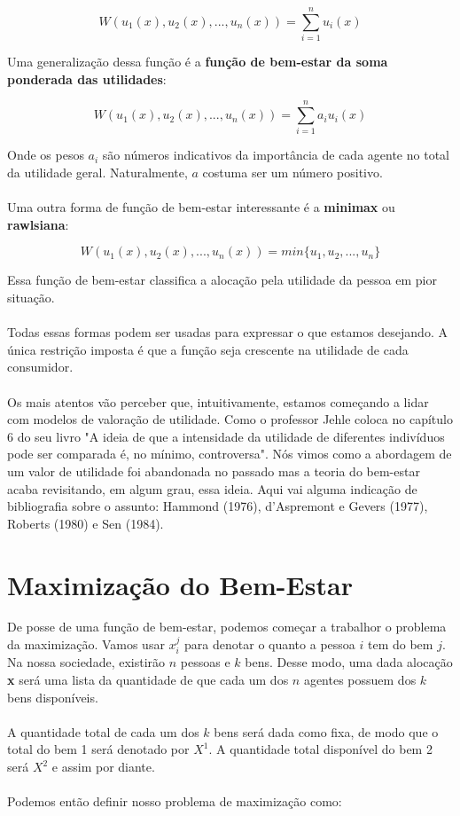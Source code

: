 \documentclass[a4paper,11pt,oneside]{book}
\theoremstyle{definition}
\theoremstyle{break}
\begin{document}
$$ W(u_1(x),u_2(x),...,u_n(x)) = \displaystyle \sum^n_{i = 1} u_i(x)$$

Uma generalização dessa função é a \textbf{função de bem-estar da soma ponderada das utilidades}:

$$ W(u_1(x),u_2(x),...,u_n(x)) = \displaystyle \sum^n_{i = 1} a_iu_i(x)$$

Onde os pesos $a_i$ são números indicativos da importância de cada agente no total da utilidade geral. Naturalmente, $a$ costuma ser um número positivo.
\\~\\
Uma outra forma de função de bem-estar interessante é a \textbf{minimax} ou \textbf{rawlsiana}:

$$ W(u_1(x),u_2(x),...,u_n(x)) = min\{ u_1, u_2, ..., u_n \} $$

Essa função de bem-estar classifica a alocação pela utilidade da pessoa em pior situação.
\\~\\
Todas essas formas podem ser usadas para expressar o que estamos desejando. A única restrição imposta é que a função seja crescente na utilidade de cada consumidor.
\\~\\
Os mais atentos vão perceber que, intuitivamente, estamos começando a lidar com modelos de valoração de utilidade. Como o professor Jehle coloca no capítulo 6 do seu livro "A ideia de que a intensidade da utilidade de diferentes indivíduos pode ser comparada é, no mínimo, controversa". Nós vimos como a abordagem de um valor de utilidade foi abandonada no passado mas a teoria do bem-estar acaba revisitando, em algum grau, essa ideia. Aqui vai alguma indicação de bibliografia sobre o assunto: Hammond (1976), d'Aspremont e Gevers (1977), Roberts (1980) e Sen (1984).

\section{Maximização do Bem-Estar}

De posse de uma função de bem-estar, podemos começar a trabalhor o problema da maximização. Vamos usar $x_i^j$ para denotar o quanto a pessoa $i$ tem do bem $j$. Na nossa sociedade, existirão $n$ pessoas e $k$ bens. Desse modo, uma dada alocação \textbf{x} será uma lista da quantidade de que cada um dos $n$ agentes possuem dos $k$ bens disponíveis.
\\~\\
A quantidade total de cada um dos $k$ bens será dada como fixa, de modo que o total do bem 1 será denotado por $X^1$. A quantidade total disponível do bem 2 será $X^2$ e assim por diante.
\\~\\
Podemos então definir nosso problema de maximização como:
\end{document}
